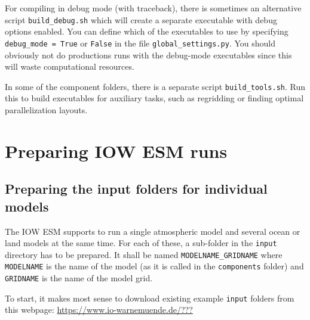 \documentclass[a4paper,titlepage]{scrartcl}
\begin{document}
For compiling in debug mode (with traceback), there is sometimes an alternative script \texttt{build\_debug.sh} which will create a separate executable with debug options enabled. You can define which of the executables to use by specifying \texttt{debug\_mode = True} or \texttt{False} in the file \texttt{global\_settings.py}. You should obviously not do productions runs with the debug-mode executables since this will waste computational resources.

In some of the component folders, there is a separate script \texttt{build\_tools.sh}. 
Run this to build executables for auxiliary tasks, such as regridding or finding optimal parallelization layouts.

\newpage
\section{Preparing IOW ESM runs}
\subsection{Preparing the input folders for individual models}
\label{sec:preparing_input_folders}

The IOW ESM supports to run a single atmospheric model and several ocean or land models at the same time.
For each of these, a sub-folder in the \texttt{input} directory has to be prepared.
It shall be named \texttt{\color{red}MODELNAME\color{black}\_\color{red}GRIDNAME} where \texttt{\color{red}MODELNAME} is the name of the model (as it is called in the \texttt{components} folder) and \texttt{\color{red}GRIDNAME} is the name of the model grid.

To start, it makes most sense to download existing example \texttt{input} folders from this webpage: 
\color{red}\url{https://www.io-warnemuende.de/???}\color{black}
\end{document}
